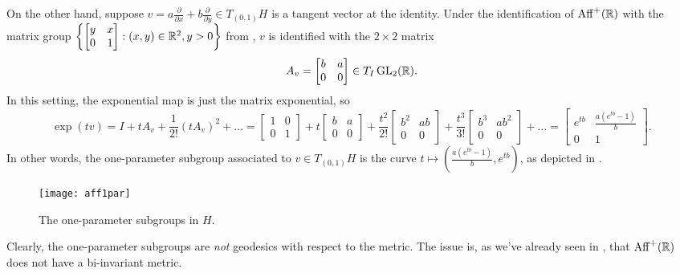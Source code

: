 \begin{example}
	On the other hand, suppose $v = a \frac{\partial}{\partial x} + b \frac{\partial}{\partial y} \in T_{(0,1)}H$ is a tangent vector at the identity. Under the identification of $\operatorname{Aff}^+(\mathbb{R})$ with the matrix group $\left\{\begin{bmatrix} y & x \\ 0 & 1 \end{bmatrix} : (x,y) \in \mathbb{R}^2, y > 0\right\}$ from , $v$ is identified with the $2 \times 2$ matrix
	\[
		A_v = \begin{bmatrix} b & a \\ 0 & 0 \end{bmatrix} \in T_I \operatorname{GL}_2(\mathbb{R}).
	\]
	In this setting, the exponential map is just the matrix exponential, so 
	\[
		\exp(tv) = I + tA_v + \frac{1}{2!} (tA_v)^2 + \dots = \begin{bmatrix} 1 & 0 \\ 0 & 1 \end{bmatrix} + t\begin{bmatrix} b & a \\ 0 & 0 \end{bmatrix} + \frac{t^2}{2!} \begin{bmatrix} b^2 & ab \\ 0 & 0 \end{bmatrix} + \frac{t^3}{3!} \begin{bmatrix} b^3 & ab^2 \\ 0 & 0 \end{bmatrix} + \dots = \begin{bmatrix} e^{tb} & \frac{a(e^{tb}-1)}{b} \\ 0 & 1 \end{bmatrix}.
	\]
	In other words, the one-parameter subgroup associated to $v \in T_{(0,1)}H$ is the curve $t \mapsto \left(\frac{a(e^{tb}-1)}{b},e^{tb}\right)$, as depicted in .
	
	\begin{figure}[htbp]
		\centering
			\texttt{[image: aff1par]}
		\caption{The one-parameter subgroups in $H$.}
		\label{fig:aff1par}
	\end{figure}
	
	Clearly, the one-parameter subgroups are \emph{not} geodesics with respect to the metric. The issue is, as we've already seen in , that $\operatorname{Aff}^+(\mathbb{R})$ does not have a bi-invariant metric.
\end{example}


